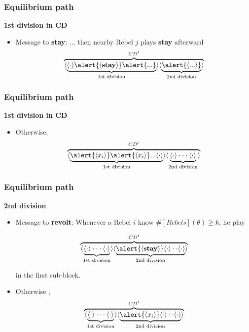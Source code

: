 \documentclass[10pt]{beamer}
\begin{document}
\begin{frame}
\frametitle{Equilibrium path}

\textbf{1st division in CD}


\begin{itemize}
\item \alert{Message to \textbf{stay}}: ... then nearby Rebel $j$ {plays \textbf{stay} afterward}
\[\overbrace{\langle\underbrace{{\langle \cdot \rangle} \alert{\langle \textbf{stay} \rangle} \alert{...}}_{\text{1st division}}\rangle \langle\underbrace{\alert{\langle ... \rangle}}_{\text{2nd division}} \rangle }^{CD^t}\] 



\end{itemize}

\end{frame}

\begin{frame}
\frametitle{Equilibrium path}

\textbf{1st division in CD}


\begin{itemize}


\item \alert{Otherwise},
\[\overbrace{\langle\underbrace{\alert{\langle x_i \rangle} \alert{\langle x_i \rangle} ... \langle \cdot \rangle}_{\text{1st division}}\rangle \langle\underbrace{\langle \cdot \rangle \cdot \cdot \cdot \langle \cdot \rangle}_{\text{2nd division}} \rangle }^{CD^t}\] 

\end{itemize}

\end{frame}


\begin{frame}
\frametitle{Equilibrium path}

\textbf{2nd division}

\begin{itemize}
\item \alert{Message to \textbf{revolt}}: Whenever a Rebel $i$ know \alert{$\#[Rebels](\theta)\geq k$}, he play

\[\overbrace{\langle\underbrace{\langle \cdot \rangle \cdot \cdot \cdot \langle \cdot \rangle}_{\text{1st division}}\rangle \langle\underbrace{\alert{\langle \textbf{stay} \rangle} \langle \cdot \rangle \cdot \cdot \langle \cdot \rangle}_{\text{2nd division}} \rangle }^{CD^t}\] 

in the first sub-block.
\item \alert{Otherwise} ,
\[\overbrace{\langle\underbrace{\langle \cdot \rangle \cdot \cdot \cdot \langle \cdot \rangle}_{\text{1st division}}\rangle \langle\underbrace{\alert{\langle x_i \rangle} \langle \cdot \rangle \cdot \cdot \langle \cdot \rangle}_{\text{2nd division}} \rangle }^{CD^t}\]
\end{itemize}

\end{frame}
\end{document}
